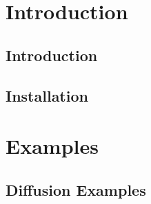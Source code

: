 \documentclass[letterpaper]{book}
\begin{document}
\mainmatter

\part{Introduction}

\parttoc

\chapter{Introduction}





\chapter{Installation}








\part{Examples}

\parttoc

\chapter{Diffusion Examples}


\newpage

\newpage

\newpage

\newpage

\newpage

\newpage

\newpage

\newpage

\newpage

\newpage

\newpage
\end{document}
